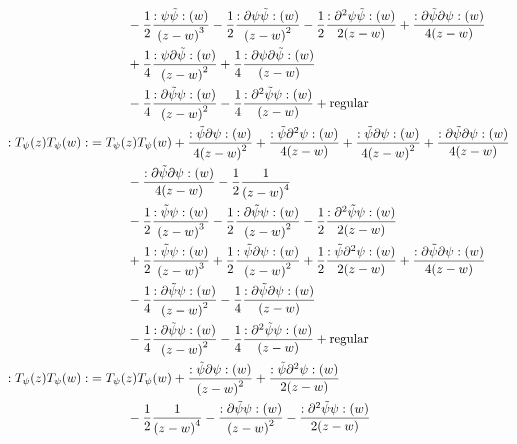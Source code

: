 \begin{align*}
    &\quad\quad\quad-\frac12\frac{\cnord{\psi\tilde\psi}\qty(w)}{\qty(z-w)^3}-\frac12\frac{\cnord{\partial\psi\tilde\psi}\qty(w)}{\qty(z-w)^2}-\frac12\frac{\cnord{\partial^2\psi\tilde\psi}\qty(w)}{2\qty(z-w)}+\frac{\cnord{\partial\tilde\psi\partial\psi}\qty(w)}{4\qty(z-w)}\\
    &\quad\quad\quad+\frac14\frac{\cnord{\psi\partial\tilde\psi}\qty(w)}{\qty(z-w)^2}+\frac14\frac{\cnord{\partial\psi\partial\tilde\psi}\qty(w)}{\qty(z-w)}\\
    &\quad\quad\quad-\frac14\frac{\cnord{\partial\tilde\psi\psi}\qty(w)}{\qty(z-w)^2}-\frac14\frac{\cnord{\partial^2\tilde\psi\psi}\qty(w)}{\qty(z-w)}+\textnormal{regular}\\
    \cnord{T_\psi\qty(z)T_\psi\qty(w)}&=T_\psi\qty(z)T_\psi\qty(w)+\frac{\cnord{\tilde\psi\partial\psi}\qty(w)}{4\qty(z-w)^2}+\frac{\cnord{\tilde\psi\partial^2\psi}\qty(w)}{4\qty(z-w)}+\frac{\cnord{\tilde\psi\partial\psi}\qty(w)}{4\qty(z-w)^2}+\frac{\cnord{\partial\tilde\psi\partial\psi}\qty(w)}{4\qty(z-w)}\\
    &\quad\quad\quad-\frac{\cnord{\partial\tilde\psi\partial\psi}\qty(w)}{4\qty(z-w)}-\frac12\frac{1}{\qty(z-w)^4}\\
    &\quad\quad\quad-\frac12\frac{\cnord{\tilde\psi\psi}\qty(w)}{\qty(z-w)^3}-\frac12\frac{\cnord{\partial\tilde\psi\psi}\qty(w)}{\qty(z-w)^2}-\frac12\frac{\cnord{\partial^2\tilde\psi\psi}\qty(w)}{2\qty(z-w)}\\
    &\quad\quad\quad+\frac12\frac{\cnord{\tilde\psi\psi}\qty(w)}{\qty(z-w)^3}+\frac12\frac{\cnord{\tilde\psi\partial\psi}\qty(w)}{\qty(z-w)^2}+\frac12\frac{\cnord{\tilde\psi\partial^2\psi}\qty(w)}{2\qty(z-w)}+\frac{\cnord{\partial\tilde\psi\partial\psi}\qty(w)}{4\qty(z-w)}\\
    &\quad\quad\quad-\frac14\frac{\cnord{\partial\tilde\psi\psi}\qty(w)}{\qty(z-w)^2}-\frac14\frac{\cnord{\partial\tilde\psi\partial\psi}\qty(w)}{\qty(z-w)}\\
    &\quad\quad\quad-\frac14\frac{\cnord{\partial\tilde\psi\psi}\qty(w)}{\qty(z-w)^2}-\frac14\frac{\cnord{\partial^2\tilde\psi\psi}\qty(w)}{\qty(z-w)}+\textnormal{regular}\\
    \cnord{T_\psi\qty(z)T_\psi\qty(w)}&=T_\psi\qty(z)T_\psi\qty(w)+\frac{\cnord{\tilde\psi\partial\psi}\qty(w)}{\qty(z-w)^2}+\frac{\cnord{\tilde\psi\partial^2\psi}\qty(w)}{2\qty(z-w)}\\
    &\quad\quad\quad-\frac12\frac{1}{\qty(z-w)^4}-\frac{\cnord{\partial\tilde\psi\psi}\qty(w)}{\qty(z-w)^2}-\frac{\cnord{\partial^2\tilde\psi\psi}\qty(w)}{2\qty(z-w)}\\

\end{align*}
